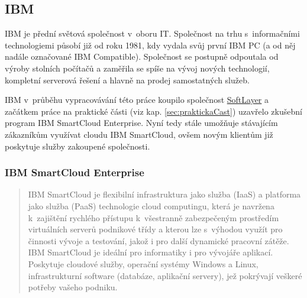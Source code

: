 \subsection{IBM}
IBM je přední světová společnost v~oboru IT. Společnost na trhu s~informačními technologiemi působí již od roku 1981, kdy vydala svůj první IBM PC (a od něj nadále označované IBM Compatible). Společnost se postupně odpoutala od výroby stolních počítačů a zaměřila se spíše na vývoj nových technologií, kompletní serverová řešení a hlavně na prodej samostatných služeb.

IBM v~průběhu vypracovávání této práce koupilo společnost \href{http://www.softlayer.com/}{SoftLayer} a začátkem práce na praktické části (viz kap. \ref{sec:praktickaCast}) uzavřelo zkušební program IBM SmartCloud Enterprise. Nyní tedy stále umožňuje stávajícím zákazníkům využívat cloudu IBM SmartCloud, ovšem novým klientům již poskytuje služby zakoupené společnosti.\cite{zive:ibmKupujeSoftLayer}

\subsubsection{IBM SmartCloud Enterprise}
\begin{quote}
IBM SmartCloud je flexibilní infrastruktura jako služba (IaaS) a platforma jako služba (PaaS) technologie cloud computingu, která je navržena k~zajištění rychlého přístupu k~všestranně zabezpečeným prostředím virtuálních serverů podnikové třídy a kterou lze s~výhodou využít pro činnosti vývoje a testování, jakož i pro další dynamické pracovní zátěže. IBM SmartCloud je ideální pro informatiky i pro vývojáře aplikací. Poskytuje cloudové služby, operační systémy Windows a Linux, infrastrukturní software (databáze, aplikační servery), jež pokrývají veškeré potřeby vašeho podniku.\cite{ibm:smartCloudEnt}
\end{quote}

